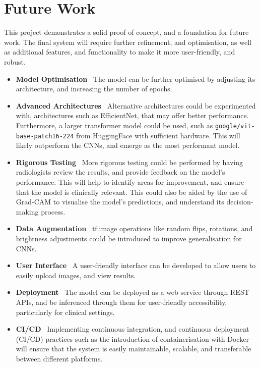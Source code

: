 \documentclass[../main]{subfiles}
\begin{document}
\section{Future Work}
This project demonstrates a solid proof of concept, and a foundation for future work. The final system will require further refinement, and optimisation, as well as additional features, and functionality to make it more user-friendly, and robust.

\begin{itemize}
	\item \textbf{Model Optimisation} \textemdash\ The model can be further optimised by adjusting its architecture, and increasing the number of epochs.
    \item \textbf{Advanced Architectures} \textemdash\ Alternative architectures could be experimented with, architectures such as EfficientNet, that may offer better performance. Furthermore, a larger transformer model could be used, such as \texttt{google/vit-base-patch16-224} from HuggingFace with sufficient hardware. This will likely outperform the CNNs, and emerge as the most performant model.
    \item \textbf{Rigorous Testing} \textemdash\ More rigorous testing could be performed by having radiologists review the results, and provide feedback on the model's performance. This will help to identify areas for improvement, and ensure that the model is clinically relevant. This could also be aided by the use of Grad-CAM to visualise the model's predictions, and understand its decision-making process.
	\item \textbf{Data Augmentation} \textemdash\ tf.image operations like random flips, rotations, and brightness adjustments could be introduced to improve generalisation for CNNs.
	\item \textbf{User Interface} \textemdash\ A user-friendly interface can be developed to allow users to easily upload images, and view results.
	\item \textbf{Deployment} \textemdash\ The model can be deployed as a web service through REST APIs, and be inferenced through them for user-friendly accessibility, particularly for clinical settings.
	\item \textbf{CI/CD} \textemdash\ Implementing continuous integration, and continuous deployment (CI/CD) practices such as the introduction of containerisation with Docker will ensure that the system is easily maintainable, scalable, and transferable between different platforms.
\end{itemize}
\end{document}
